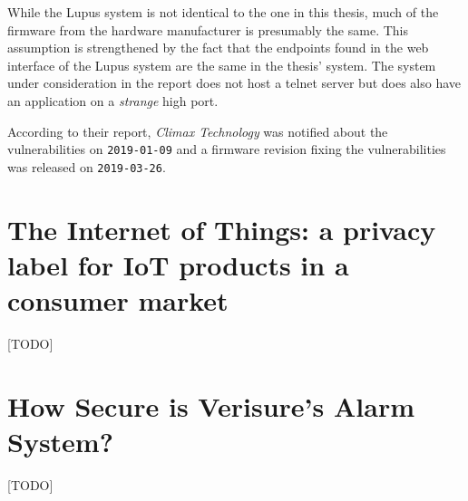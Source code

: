 While the Lupus system is not identical to the one in this thesis, much of the firmware from the hardware manufacturer is presumably the same. This assumption is strengthened by the fact that the endpoints found in the web interface of the Lupus system are the same in the thesis' system. The system under consideration in the report does not host a telnet server but does also have an application on a \textit{strange} high port.

According to their report, \textit{Climax Technology} was notified about the vulnerabilities on \texttt{2019-01-09} and a firmware revision fixing the vulnerabilities was released on \texttt{2019-03-26}.

\section{The Internet of Things: a privacy label for IoT products in a consumer market}
[TODO] \cite{iotprivacylabel}

\section{How Secure is Verisure’s Alarm System?}
[TODO] \cite{verisurethesis}